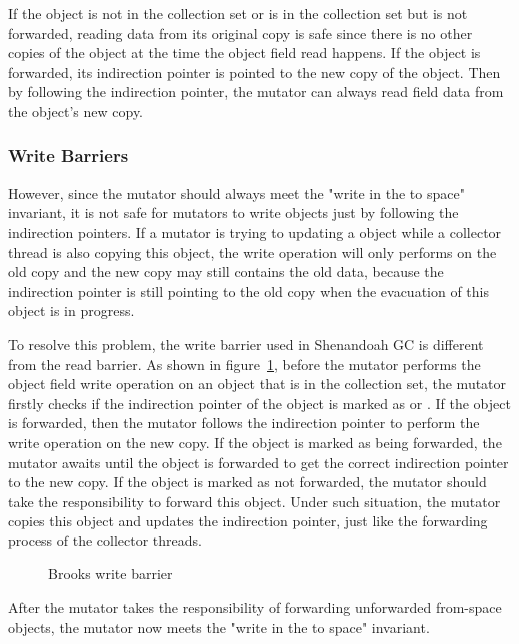 If the object is not in the collection set or is in the collection set but is not forwarded,
reading data from its original copy is safe since there is no other copies of the object
at the time the object field read happens.
If the object is forwarded, its indirection pointer is pointed to the new copy of the object.
Then by following the indirection pointer, the mutator can always read field data from the object's new copy.

\subsubsection{Write Barriers}

However, since the mutator should always meet the "write in the to space" invariant,
it is not safe for mutators to write objects just by following the indirection pointers.
If a mutator is trying to updating a object while a collector thread is also copying
this object, the write operation will only performs on the old copy and the new copy may still contains the
old data, because the indirection pointer is still pointing to the old copy when
the evacuation of this object is in progress.

To resolve this problem, the write barrier used in Shenandoah GC is different from the
read barrier. As shown in figure~\ref{fig:brookswritebarrier}, before the mutator
performs the object field write operation on an object that is in the collection set,
the mutator firstly checks if the indirection pointer of the object is marked as 
or . If the object is forwarded, then the mutator follows
the indirection pointer to perform the write operation on the new copy.
If the object is marked as being forwarded, the mutator awaits until the object is forwarded to
get the correct indirection pointer to the new copy.
If the object is marked as not forwarded, the mutator should take the responsibility to forward this object.
Under such situation, the mutator copies this object and updates the indirection pointer,
just like the forwarding process of the collector threads.

\begin{figure}
  \centering
  
  \caption{Brooks write barrier}
  \label{fig:brookswritebarrier}
\end{figure}

After the mutator takes the responsibility of forwarding unforwarded from-space objects,
the mutator now meets the "write in the to space" invariant. 

